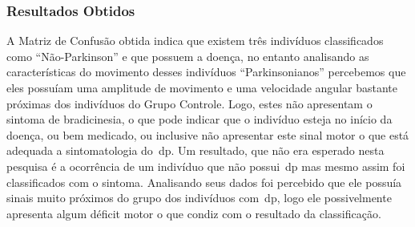 %
%
%
%
%



\subsubsection{Resultados Obtidos}
A Matriz de Confusão obtida indica que existem três indivíduos classificados como ``Não-Parkinson'' e que possuem a doença, no entanto analisando as características do movimento desses indivíduos ``Parkinsonianos'' percebemos que eles possuíam uma amplitude de movimento e uma velocidade angular bastante próximas dos indivíduos do Grupo Controle. Logo, estes não apresentam o sintoma de bradicinesia, o que pode indicar que o indivíduo esteja no início da doença, ou bem medicado, ou inclusive não apresentar este sinal motor o que está adequada a sintomatologia do~\ac{dp}. 
Um resultado, que não era esperado nesta pesquisa é a ocorrência de um indivíduo que não possui~\ac{dp} mas mesmo assim foi classificados com o sintoma. Analisando seus dados foi percebido que ele possuía sinais muito próximos do grupo dos indivíduos com~\ac{dp}, logo ele possivelmente apresenta algum déficit motor o que condiz com o resultado da classificação.

